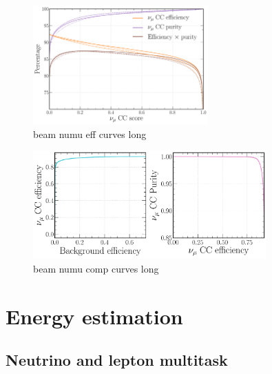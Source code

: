 \begin{figure} %
    \includegraphics[width=0.6\textwidth]{diagrams/6-cvn/chipsnet/beam_numu_eff_curves.pdf}
    \caption[beam numu eff curves short]
    {beam numu eff curves long}
    \label{fig:beam_numu_eff_curves}
\end{figure}

\begin{figure} %
    \includegraphics[width=0.8\textwidth]{diagrams/6-cvn/chipsnet/beam_numu_comp_curves.pdf}
    \caption[beam numu comp curves short]
    {beam numu comp curves long}
    \label{fig:beam_numu_comp_curves}
\end{figure}

\section{Energy estimation} %
\label{sec:cvn_energy} %

\subsection{Neutrino and lepton multitask} %
\label{sec:cvn_energy_chan} %

